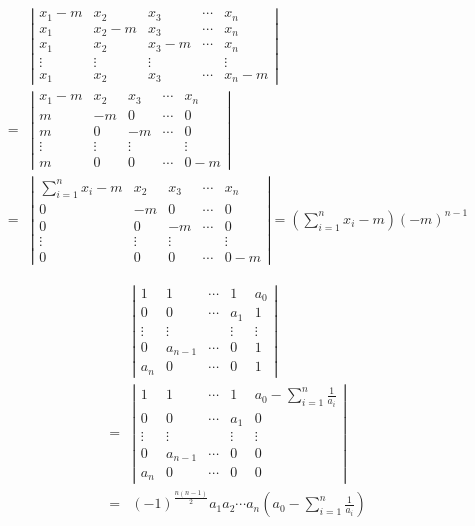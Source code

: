 \documentclass[13pt, mathserif]{ctexbeamer}
\begin{document}
\begin{frame}
	\small{
\begin{align*}
& 	\left|\begin{array}{ccccc}
		x_{1}-m & x_{2} & x_{3} & \cdots & x_{n} \\
		x_{1} & x_{2}-m & x_{3} & \cdots & x_{n} \\
		x_{1} & x_{2} & x_{3}-m & \cdots & x_{n} \\
		\vdots & \vdots & \vdots & & \vdots \\
		x_{1} & x_{2} & x_{3} & \cdots & x_{n}-m
	\end{array}\right|\\[-3pt]
= & \left|\begin{array}{ccccc}
		x_{1}-m & x_{2} & x_{3} & \cdots & x_{n} \\
		m & -m & 0 & \cdots & 0 \\
		m & 0 & -m & \cdots & 0 \\
		\vdots & \vdots & \vdots & & \vdots \\
		m & 0 & 0 & \cdots & 0-m
	\end{array}\right|\\[-3pt]
 = & \left|\begin{array}{ccccc}
		\sum_{i=1}^{n} x_{i}-m & x_{2} & x_{3} & \cdots & x_{n} \\
		0 & -m & 0 & \cdots & 0 \\
		0 & 0 & -m & \cdots & 0 \\
		\vdots & \vdots & \vdots & & \vdots \\
		0 & 0 & 0 & \cdots & 0-m
	\end{array}\right|=\left(\sum_{i=1}^{n} x_{i}-m\right)(-m)^{n-1}
\end{align*}}
\end{frame}

\begin{frame}
\begin{align*}
& 	\left|\begin{array}{ccccc}
		1 & 1 & \cdots & 1 & a_{0} \\
		0 & 0 & \cdots & a_{1} & 1 \\
		\vdots & \vdots & & \vdots & \vdots \\
		0 & a_{n-1} & \cdots & 0 & 1 \\
		a_{n} & 0 & \cdots & 0 & 1
	\end{array}\right| \\[8pt]
= & \left|\begin{array}{ccccc}
		1 & 1 & \cdots & 1 & a_{0}-\sum_{i=1}^{n} \frac{1}{a_{i}} \\
		0 & 0 & \cdots & a_{1} & 0 \\
		\vdots & \vdots & & \vdots & \vdots \\
		0 & a_{n-1} & \cdots & 0 & 0 \\
		a_{n} & 0 & \cdots & 0 & 0
	\end{array}\right|  \\[8pt]
= & (-1)^{\frac{n(n-1)}{2}} a_{1} a_{2} \cdots a_{n}\left(a_{0}-\sum_{i=1}^{n} \frac{1}{a_{i}}\right)
\end{align*}
\end{frame}
\end{document}

